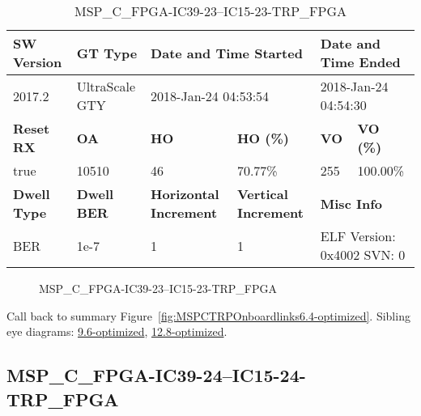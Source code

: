 \begin{table}[h]
\centering
\caption{MSP\_C\_FPGA-IC39-23--IC15-23-TRP\_FPGA}
\label{tab:MSPCFPGAIC3923IC1523TRPFPGA6.4-optimized}
\begin{tabular}{@{}|l|l|l|l|l|l|@{}}
\toprule
\textbf{SW Version}                & \textbf{GT Type}   & \multicolumn{2}{l|}{\textbf{Date and Time Started}}            & \multicolumn{2}{l|}{\textbf{Date and Time Ended}}        \\ \midrule
2017.2                       & UltraScale GTY          & \multicolumn{2}{l|}{2018-Jan-24 04:53:54}                   & \multicolumn{2}{l|}{2018-Jan-24 04:54:30}               \\ \midrule
\textbf{Reset RX}                  & \textbf{OA} & \textbf{HO}   & \textbf{HO (\%)} & \textbf{VO} & \textbf{VO (\%)} \\ \midrule
true & 10510        & 46          & 70.77\%        & 255        & 100.00\%       \\ \midrule
\textbf{Dwell Type}                & \textbf{Dwell BER} & \textbf{Horizontal Increment} & \textbf{Vertical Increment}    & \multicolumn{2}{l|}{\textbf{Misc Info}}                  \\ \midrule
BER                            & 1e-7        & 1        & 1           & \multicolumn{2}{l|}{ELF Version: 0x4002 SVN: 0}                         \\ \bottomrule
\end{tabular}
\end{table}

\begin{figure}[h]
\caption{MSP\_C\_FPGA-IC39-23--IC15-23-TRP\_FPGA} \label{fig:MSPCFPGAIC3923IC1523TRPFPGA6.4-optimized}
\end{figure}

Call back to summary Figure~\ref{fig:MSPCTRPOnboardlinks6.4-optimized}.
Sibling eye diagrams: \hyperref[sec:MSPCFPGAIC3923IC1523TRPFPGA9.6-optimized]{9.6-optimized}, \hyperref[sec:MSPCFPGAIC3923IC1523TRPFPGA12.8-optimized]{12.8-optimized}.

\clearpage
\newpage


\subsection{MSP\_C\_FPGA-IC39-24--IC15-24-TRP\_FPGA}\label{sec:MSPCFPGAIC3924IC1524TRPFPGA6.4-optimized}

